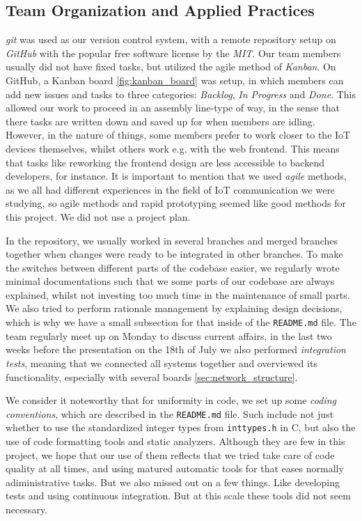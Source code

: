 \documentclass[acmtog, language=english, nonacm]{acmart}
\begin{document}
    \subsection{Team Organization and Applied Practices}

    \emph{git} was used as our version control system, with a remote repository setup on \emph{GitHub} with the popular free software license by the \emph{MIT}. Our team members usually did not have fixed tasks, but utilized the agile method of \emph{Kanban}. On GitHub, a Kanban board \cref{fig:kanban_board} was setup, in which members can add new issues and tasks to three categories: \emph{Backlog}, \emph{In Progress} and \emph{Done}. This allowed our work to proceed in an assembly line-type of way, in the sense that there tasks are written down and saved up for when members are idling. However, in the nature of things, some members prefer to work closer to the IoT devices themselves, whilst others work e.g. with the web frontend. This means that tasks like reworking the frontend design are less accessible to backend developers, for instance. It is important to mention that we used \emph{agile} methods, as we all had different experiences in the field of IoT communication we were studying, so agile methods and rapid prototyping seemed like good methods for this project. We did not use a project plan.

    In the repository, we usually worked in several branches and merged branches together when changes were ready to be integrated in other branches. To make the switches between different parts of the codebase easier, we regularly wrote minimal documentations such that we some parts of our codebase are always explained, whilst not investing too much time in the maintenance of small parts. We also tried to perform rationale management by explaining design decisions, which is why we have a small subsection for that inside of the \texttt{README.md} file. The team regularly meet up on Monday to discuss current affairs, in the last two weeks before the presentation on the 18th of July we also performed \emph{integration tests}, meaning that we connected all systems together and overviewed its functionality, especially with several boards \cref{sec:network_structure}.

    We consider it noteworthy that for uniformity in code, we set up some \emph{coding conventions}, which are described in the \texttt{README.md} file. Such include not just whether to use the standardized integer types from \texttt{inttypes.h} in C, but also the use of code formatting tools and static analyzers. Although they are few in this project, we hope that our use of them reflects that we tried take care of code quality at all times, and using matured automatic tools for that eases normally adiministrative tasks. But we also missed out on a few things. Like developing tests and using continuous integration. But at this scale these tools did not seem necessary.
    
\end{document}
